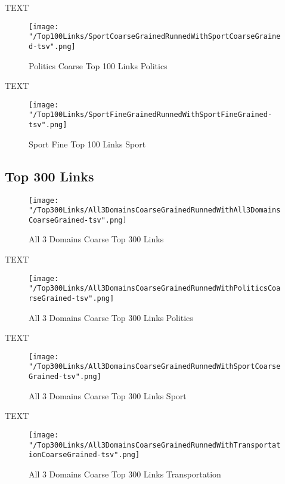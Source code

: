 \documentclass[thesis=M,english]{FITthesis}[2018/05/30]
\begin{document}
	
	TEXT

	\begin{figure}[H]\centering
		\texttt{[image: "/Top100Links/SportCoarseGrainedRunnedWithSportCoarseGrained-tsv".png]}
		\caption{Politics Coarse Top 100 Links Politics}\label{}
	\end{figure}		
	
		TEXT	

	\begin{figure}[H]\centering
		\texttt{[image: "/Top100Links/SportFineGrainedRunnedWithSportFineGrained-tsv".png]}
		\caption{Sport Fine Top 100 Links Sport}\label{}	
	\end{figure}

\subsection{Top 300 Links}

	\begin{figure}[H]\centering
		\texttt{[image: "/Top300Links/All3DomainsCoarseGrainedRunnedWithAll3DomainsCoarseGrained-tsv".png]}
		\caption{All 3 Domains Coarse Top 300 Links}\label{}
	\end{figure}

	TEXT

	\begin{figure}[H]\centering
		\texttt{[image: "/Top300Links/All3DomainsCoarseGrainedRunnedWithPoliticsCoarseGrained-tsv".png]}
		\caption{All 3 Domains Coarse Top 300 Links Politics}\label{}
	\end{figure}	

	TEXT	

	\begin{figure}[H]\centering
		\texttt{[image: "/Top300Links/All3DomainsCoarseGrainedRunnedWithSportCoarseGrained-tsv".png]}
		\caption{All 3 Domains Coarse Top 300 Links Sport}\label{}
	\end{figure}
	
		TEXT	

	\begin{figure}[H]\centering
		\texttt{[image: "/Top300Links/All3DomainsCoarseGrainedRunnedWithTransportationCoarseGrained-tsv".png]}
		\caption{All 3 Domains Coarse Top 300 Links Transportation}\label{}	
	\end{figure}
		
\end{document}
